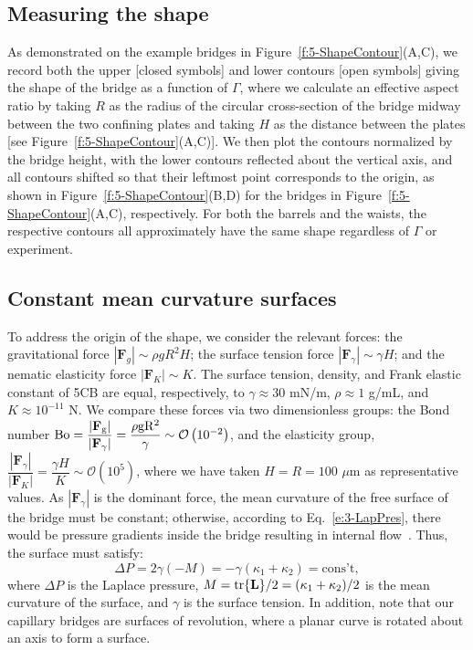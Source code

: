 \subsection{Measuring the shape}
As demonstrated on the example bridges in Figure~\ref{f:5-ShapeContour}(A,C), we record both the upper [closed symbols] and lower contours [open symbols] giving the shape of the bridge as a function of $\Gamma$, where we calculate an effective aspect ratio by taking $R$ as the radius of the circular cross-section of the bridge midway between the two confining plates and taking $H$ as the distance between the plates [see Figure~\ref{f:5-ShapeContour}(A,C)].
We then plot the contours normalized by the bridge height, with the lower contours reflected about the vertical axis, and all contours shifted so that their leftmost point corresponds to the origin, as shown in Figure~\ref{f:5-ShapeContour}(B,D) for the bridges in Figure~\ref{f:5-ShapeContour}(A,C), respectively.
For both the barrels and the waists, the respective contours all approximately have the same shape regardless of $\Gamma$ or experiment.


\subsection{Constant mean curvature surfaces}
To address the origin of the shape, we consider the relevant forces: the gravitational force $|\mathbf{F}_g| \sim \rho g R^2 H$; the surface tension force $|\mathbf{F}_{\gamma}| \sim \gamma H$; and the nematic elasticity force $|\mathbf{F}_K| \sim K$.
The surface tension, density, and Frank elastic constant of 5CB are equal, respectively, to $\gamma \approx 30$ mN/m, $\rho \approx 1$ g/mL, and $K \approx 10^{-11}$ N.
We compare these forces via two dimensionless groups: the Bond number $\rm{Bo} = \dfrac{|\mathbf{F}_g|}{|\mathbf{F}_{\gamma}|} = \dfrac{\rho g R^2}{\gamma} \sim  \mathcal{O}\left (10^{-2} \right)$, and the elasticity group,
 $\dfrac{|\mathbf{F}_{\gamma}|}{|\mathbf{F}_K|} =  \dfrac{\gamma H}{K} \sim \mathcal{O}\left (10^{5} \right )$, where we have taken $H = R = 100$ $\mu$m as representative values.
As $|\mathbf{F}_{\gamma}|$ is the dominant force, the mean curvature of the free surface of the bridge must be constant; otherwise, according to Eq.~\ref{e:3-LapPres}, there would be pressure gradients inside the bridge resulting in internal flow~\cite{RN178}.
Thus, the surface must satisfy:
\begin{equation}
  \Delta P = 2\gamma (-M) = -\gamma(\kappa_1 + \kappa_2) = \textrm{cons't},\label{e:5-ConsMeanCurv}
\end{equation}
where $\Delta P$ is the Laplace pressure, $M = {\rm tr}\{ \mathbf{L} \}/2 = (\kappa_1 + \kappa_2)/2$ is the mean curvature of the surface, and $\gamma$ is the surface tension.
In addition, note that our capillary bridges are surfaces of revolution, where a planar curve is rotated about an axis to form a surface.

